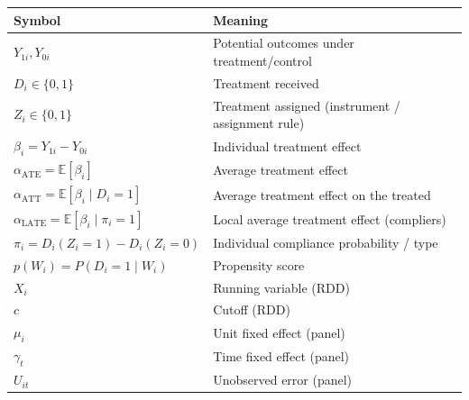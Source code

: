 \documentclass[12pt,a4paper]{article}
\theoremstyle{plain}
\theoremstyle{definition}
\newcommand{\E}{\mathbb{E}}
\newcommand{\ATT}{\alpha_{\mathrm{ATT}}}
\newcommand{\ATE}{\alpha_{\mathrm{ATE}}}
\newcommand{\LATE}{\alpha_{\mathrm{LATE}}}
\begin{document}
\begin{center}
\begin{tabular}{ll}
\toprule
Symbol & Meaning \\
\midrule
$Y_{1i},Y_{0i}$ & Potential outcomes under treatment/control \\
$D_i\in\{0,1\}$ & Treatment received \\
$Z_i\in\{0,1\}$ & Treatment assigned (instrument / assignment rule) \\
$\beta_i = Y_{1i}-Y_{0i}$ & Individual treatment effect \\
$\ATE = \E[\beta_i]$ & Average treatment effect \\
$\ATT = \E[\beta_i\mid D_i=1]$ & Average treatment effect on the treated \\
$\LATE = \E[\beta_i\mid\pi_i=1]$ & Local average treatment effect (compliers) \\
$\pi_i = D_i(Z_i=1)-D_i(Z_i=0)$ & Individual compliance probability / type \\
$p(W_i) = P(D_i=1\mid W_i)$ & Propensity score \\
$X_i$ & Running variable (RDD) \\
$c$ & Cutoff (RDD) \\
$\mu_i$ & Unit fixed effect (panel) \\
$\gamma_t$ & Time fixed effect (panel) \\
$U_{it}$ & Unobserved error (panel) \\
\bottomrule
\end{tabular}
\end{center}
\end{document}
